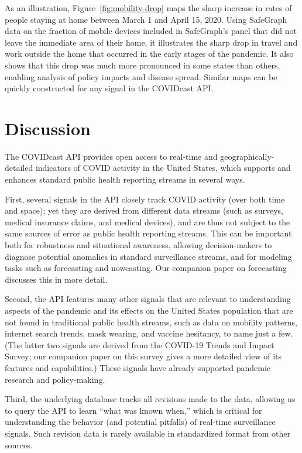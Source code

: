 \documentclass[9pt,twocolumn,twoside,lineno]{pnas-new}
\begin{document}
As an illustration, Figure~\ref{fig:mobility-drop} maps the sharp increase in
rates of people staying at home between March 1 and April 15, 2020. Using
SafeGraph data on the fraction of mobile devices included in SafeGraph's panel
that did not leave the immediate area of their home, it illustrates the sharp
drop in travel and work outside the home that occurred in the early stages of
the pandemic. It also shows that this drop was much more pronounced in some
states than others, enabling analysis of policy impacts and disease spread.
Similar maps can be quickly constructed for any signal in the COVIDcast API.

\section{Discussion}

The COVIDcast API provides open access to real-time and geographically-detailed
indicators of COVID activity in the United States, which supports and enhances
standard public health reporting streams in several ways.

First, several signals in the API closely track COVID activity (over both time
and space); yet they are derived from different data streams (such as surveys,
medical insurance claims, and medical devices), and are thus not subject to the
same sources of error as public health reporting streams. This can be important
both for robustness and situational awareness, allowing decision-makers to
diagnose potential anomalies in standard surveillance streams, and for modeling
tasks such as forecasting and nowcasting. Our companion paper on forecasting
discusses this in more detail.

Second, the API features many other signals that are relevant to understanding
aspects of the pandemic and its effects on the United States population that are
not found in traditional public health streams, such as data on mobility
patterns, internet search trends, mask wearing, and vaccine hesitancy, to name
just a few. (The latter two signals are derived from the COVID-19 Trends and Impact
Survey; our companion paper on this survey gives a more detailed view of its
features and capabilities.) These signals have already supported pandemic
research and  policy-making.

Third, the underlying database tracks all revisions made to the data, allowing
us to query the API to learn ``what was known when,'' which is critical for
understanding the behavior (and potential pitfalls) of real-time surveillance
signals. Such revision data is rarely available in standardized format from
other sources.
\end{document}
